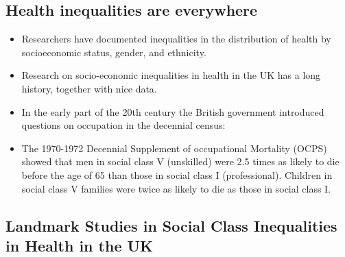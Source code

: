     \subsection{Health inequalities are everywhere}
    
        \begin{itemize}
            \item Researchers have documented inequalities in the distribution of health by socioeconomic status, gender, and ethnicity.
            \item Research on socio-economic inequalities in health in the UK has a long history, together with nice data.
            \item In the early part of the 20th century the British government introduced questions on occupation in the decennial census:
            \item The 1970-1972 Decennial Supplement of occupational Mortality (OCPS) showed that men in social class V (unskilled) were 2.5 times as likely to die before the age of 65 than those in social class I (professional). Children in social class V families were twice as likely to die as those in social class I.
        \end{itemize} 

    \subsection{Landmark Studies in Social Class Inequalities in Health in the UK}

